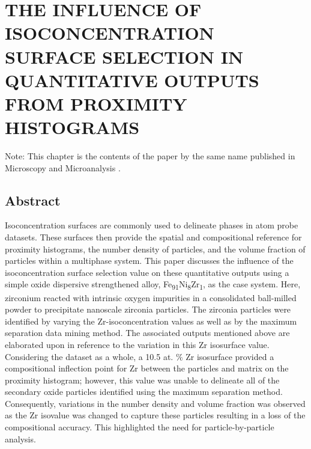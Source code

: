 \chapter{THE INFLUENCE OF ISOCONCENTRATION SURFACE SELECTION IN QUANTITATIVE OUTPUTS FROM PROXIMITY HISTOGRAMS}


Note: This chapter is the contents of the paper by the same name published in Microscopy and Microanalysis \cite{RN1023}.



\section*{Abstract}

	Isoconcentration surfaces are commonly used to delineate phases in atom probe datasets. These surfaces then provide the spatial and compositional reference for proximity histograms, the number density of particles, and the volume fraction of particles within a multiphase system. This paper discusses the influence of the isoconcentration surface selection value on these quantitative outputs using a simple oxide dispersive strengthened alloy, Fe\textsubscript{91}Ni\textsubscript{8}Zr\textsubscript{1}, as the case system. Here, zirconium reacted with intrinsic oxygen impurities in a consolidated ball-milled powder to precipitate nanoscale zirconia particles. The zirconia particles were identified by varying the Zr-isoconcentration values as well as by the maximum separation data mining method. The associated outputs mentioned above are elaborated upon in reference to the variation in this Zr isosurface value. Considering the dataset as a whole, a 10.5 at. $\%$ Zr isosurface provided a compositional inflection point for Zr between the particles and matrix on the proximity histogram; however, this value was unable to delineate all of the secondary oxide particles identified using the maximum separation method. Consequently, variations in the number density and volume fraction was observed as the Zr isovalue was changed to capture these particles resulting in a loss of the compositional accuracy. This highlighted the need for particle-by-particle analysis. 






